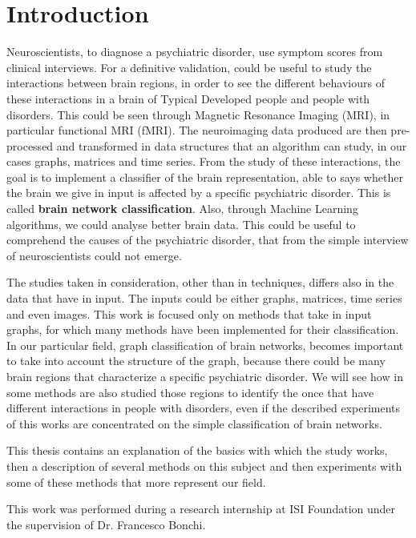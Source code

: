 \chapter{Introduction}
\label{chap:1}

Neuroscientists, to diagnose a psychiatric disorder, use symptom scores from clinical interviews. For a definitive validation, could be useful to study the interactions between brain regions, in order to see the different behaviours of these interactions in a brain of Typical Developed people and people with disorders. This could be seen through Magnetic Resonance Imaging (MRI), in particular functional MRI (fMRI). The neuroimaging data produced are then pre-processed and transformed in data structures that an algorithm can study, in our cases graphs, matrices and time series. From the study of these interactions, the goal is to implement a classifier of the brain representation, able to says whether the brain we give in input is affected by a specific psychiatric disorder. This is called \textbf{brain network classification}. Also, through Machine Learning algorithms, we could analyse better brain data. This could be useful to comprehend the causes of the psychiatric disorder, that from the simple interview of neuroscientists could not emerge. 

The studies taken in consideration, other than in techniques, differs also in the data that have in input. The inputs could be either graphs, matrices, time series and even images. This work is focused only on methods that take in input graphs, for which many methods have been implemented for their classification. In our particular field, graph classification of brain networks, becomes important to take into account the structure of the graph, because there could be many brain regions that characterize a specific psychiatric disorder. We will see how in some methods are also studied those regions to identify the once that have different interactions in people with disorders, even if the described experiments of this works are concentrated on the simple classification of brain networks. 

This thesis contains an explanation of the basics with which the study works, then a description of several methods on this subject and then experiments with some of these methods that more represent our field. 

This work was performed during a research internship at ISI Foundation
under the supervision of Dr. Francesco Bonchi.

